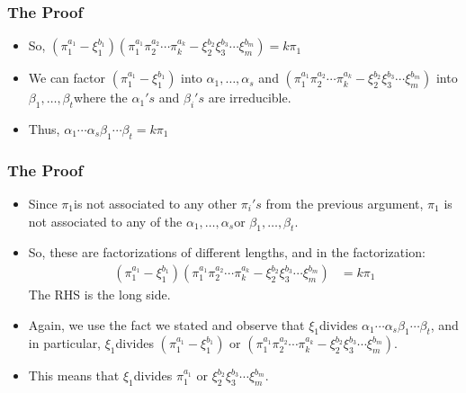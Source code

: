\begin{frame}
  \frametitle{The Proof}
  \begin{itemize}
    \item So, $(\pi_{1}^{a_{1}}-\xi_{1}^{b_{1}})(\pi_{1}^{a_{1}}\pi_{2}^{a_{2}}\cdots\pi_{k}^{a_{k}}-\xi_{2}^{b_{2}}\xi_{3}^{b_{3}}\cdots\xi_{m}^{b_{m}})=k\pi_{1}$
  \end{itemize}

  \pause{}
  \begin{itemize}
    \item We can factor $(\pi_{1}^{a_{1}}-\xi_{1}^{b_{1}})$ into $\alpha_{1},\ldots,\alpha_{s}$
      and $(\pi_{1}^{a_{1}}\pi_{2}^{a_{2}}\cdots\pi_{k}^{a_{k}}-\xi_{2}^{b_{2}}\xi_{3}^{b_{3}}\cdots\xi_{m}^{b_{m}})$
      into $\beta_{1},\ldots,\beta_{t}$where the $\alpha_{1}'s$ and $\beta_{i}'s$
      are irreducible. 
  \end{itemize}

  \pause{}
  \begin{itemize}
    \item Thus, $\alpha_{1}\cdots\alpha_{s}$$\beta_{1}\cdots\beta_{t}=k\pi_{1}$ 
  \end{itemize}
\end{frame}

\begin{frame}
  \frametitle{The Proof}
  \begin{itemize}
    \item Since $\pi_{1}$is not associated to any other $\pi_{i}'s$ from the
      previous argument, $\pi_{1}$ is not associated to any of the $\alpha_{1},\ldots,\alpha_{s}$or
      $\beta_{1},\ldots,\beta_{t}$. 
  \end{itemize}

  \pause{}
  \begin{itemize}
    \item So, these are factorizations of different lengths, and in the factorization:
      \begin{align*}
	(\pi_{1}^{a_{1}}-\xi_{1}^{b_{1}})(\pi_{1}^{a_{1}}\pi_{2}^{a_{2}}\cdots\pi_{k}^{a_{k}}-\xi_{2}^{b_{2}}\xi_{3}^{b_{3}}\cdots\xi_{m}^{b_{m}}) & =k\pi_{1}
      \end{align*}
      The RHS is the long side. 
  \end{itemize}

  \pause{}
  \begin{itemize}
    \item Again, we use the fact we stated and observe that $\xi_{1}$divides
      $\alpha_{1}\cdots\alpha_{s}$$\beta_{1}\cdots\beta_{t}$, and in particular,
      $\xi_{1}$divides $(\pi_{1}^{a_{1}}-\xi_{1}^{b_{1}})$ or $(\pi_{1}^{a_{1}}\pi_{2}^{a_{2}}\cdots\pi_{k}^{a_{k}}-\xi_{2}^{b_{2}}\xi_{3}^{b_{3}}\cdots\xi_{m}^{b_{m}}).$
    \item This means that $\xi_{1}$divides $\pi_{1}^{a_{1}}$ or $\xi_{2}^{b_{2}}\xi_{3}^{b_{3}}\cdots\xi_{m}^{b_{m}}$.
  \end{itemize}
\end{frame}


